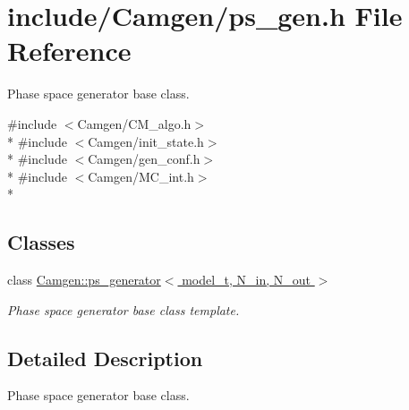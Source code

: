 \hypertarget{a00742}{}\section{include/\+Camgen/ps\+\_\+gen.h File Reference}
\label{a00742}


Phase space generator base class.  


{\ttfamily \#include $<$Camgen/\+C\+M\+\_\+algo.\+h$>$}\\*
{\ttfamily \#include $<$Camgen/init\+\_\+state.\+h$>$}\\*
{\ttfamily \#include $<$Camgen/gen\+\_\+conf.\+h$>$}\\*
{\ttfamily \#include $<$Camgen/\+M\+C\+\_\+int.\+h$>$}\\*
\subsection*{Classes}
\begin{DoxyCompactItemize}
\item 
class \hyperlink{a00450}{Camgen\+::ps\+\_\+generator$<$ model\+\_\+t, N\+\_\+in, N\+\_\+out $>$}
\begin{DoxyCompactList}\small\item\em Phase space generator base class template. \end{DoxyCompactList}\end{DoxyCompactItemize}


\subsection{Detailed Description}
Phase space generator base class. 

